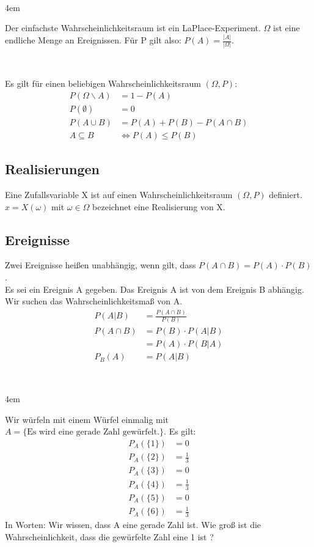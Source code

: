 \documentclass[a4paper]{article}
\newenvironment{exEnv}{\ \\\begin{addmargin}[4em]{4em}\begin{em}}{\end{em}\end{addmargin}\ }
\begin{document}
	\begin{exEnv}
		Der einfachste Wahrscheinlichkeitsraum ist ein LaPlace-Experiment. $\Omega$ ist eine endliche Menge an Ereignissen. Für P gilt also: $P(A) = \frac{|A|}{|\Omega|}$.
	\end{exEnv}


	Es gilt für einen beliebigen Wahrscheinlichkeitsraum $(\Omega, P)$:
	\setcounter{equation}{0}
	\begin{align}
		P(\Omega \backslash A) &= 1 - P(A)\\
		P(\emptyset) &= 0\\
		P(A \cup B) &= P(A) + P(B) - P(A\cap B)\\
		A \subseteq B &\iff P(A) \leq P(B)
	\end{align}
	
	\subsection{Realisierungen}
	Eine Zufallsvariable X ist auf einen Wahrscheinlichkeitsraum $(\Omega, P)$ definiert.\\
	$x = X(\omega)$ mit $\omega \in \Omega$ bezeichnet eine Realisierung von X.
	
	\subsection{Ereignisse}
	Zwei Ereignisse heißen unabhängig, wenn gilt, dass $P(A\cap B) = P(A) \cdot P(B)$.\\
	Es sei ein Ereignis A gegeben. Das Ereignis A ist von dem Ereignis B abhängig. Wir suchen das Wahrscheinlichkeitsmaß von A.\\
	
	\begin{align*}
		P(A|B) &= \frac{P(A \cap B)}{P(B)} \nonumber \\
		P(A\cap B) &= P(B) \cdot P(A|B)\\
				   &= P(A) \cdot P(B|A)\\
				   P_B(A) &= P(A|B)
	\end{align*}
	
	\begin{exEnv}
		Wir würfeln mit einem Würfel einmalig mit $A = \{\text{Es wird eine gerade Zahl gewürfelt.}\}$.
		Es gilt: 
		\begin{align*}
			P_A(\{1\}) &= 0 \\
			P_A(\{2\}) &= \frac{1}{3}\\
			P_A(\{3\}) &= 0\\
			P_A(\{4\}) &= \frac{1}{3}\\
			P_A(\{5\}) &= 0\\
			P_A(\{6\}) &= \frac{1}{3}
		\end{align*}
		In Worten: Wir wissen, dass A eine gerade Zahl ist. Wie groß ist die Wahrscheinlichkeit, dass die gewürfelte Zahl eine 1 ist ? 
		
	\end{exEnv}
	
\end{document}
